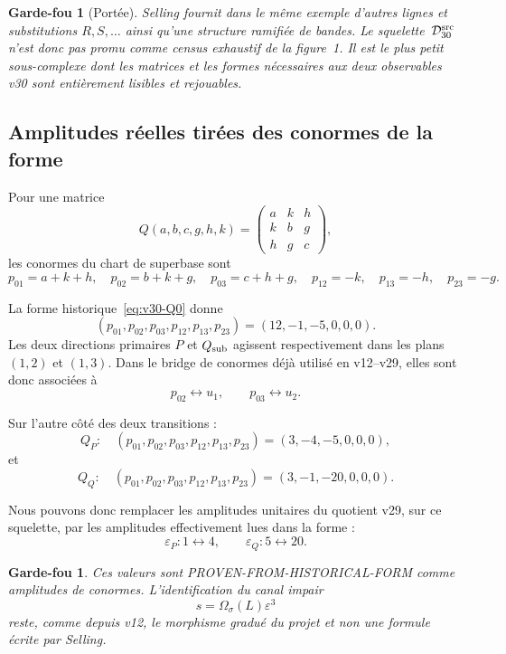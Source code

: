 \documentclass[11pt,a4paper]{article}
\newtheorem{guardrail}[theorem]{Garde-fou}
\begin{document}
\begin{guardrail}[Portée]
Selling fournit dans le même exemple d'autres lignes et substitutions $R,S,\ldots$ ainsi qu'une structure ramifiée de bandes. Le squelette~$\mathcal D_{30}^{\rm src}$ n'est donc pas promu comme census exhaustif de la figure~1. Il est le plus petit sous-complexe dont les matrices et les formes nécessaires aux deux observables v30 sont entièrement lisibles et rejouables.
\end{guardrail}

\subsection{Amplitudes réelles tirées des conormes de la forme}

Pour une matrice
\[
 Q(a,b,c,g,h,k)
 =
 \begin{pmatrix}
 a&k&h\\
 k&b&g\\
 h&g&c
 \end{pmatrix},
\]
les conormes du chart de superbase sont
\[
 p_{01}=a+k+h,\quad
 p_{02}=b+k+g,\quad
 p_{03}=c+h+g,\quad
 p_{12}=-k,\quad
 p_{13}=-h,\quad
 p_{23}=-g.
\]

La forme historique~\eqref{eq:v30-Q0} donne
\begin{equation}\label{eq:v30-conorm-Q0}
 \boxed{
 (p_{01},p_{02},p_{03},p_{12},p_{13},p_{23})
 =
 (12,-1,-5,0,0,0).}
\end{equation}
Les deux directions primaires $P$ et $Q_{\rm sub}$ agissent respectivement dans les plans $(1,2)$ et $(1,3)$. Dans le bridge de conormes déjà utilisé en v12--v29, elles sont donc associées à
\[
 p_{02}\leftrightarrow u_1,
 \qquad
 p_{03}\leftrightarrow u_2.
\]

Sur l'autre côté des deux transitions :
\[
 Q_P:\quad
 (p_{01},p_{02},p_{03},p_{12},p_{13},p_{23})
 =
 (3,-4,-5,0,0,0),
\]
et
\[
 Q_Q:\quad
 (p_{01},p_{02},p_{03},p_{12},p_{13},p_{23})
 =
 (3,-1,-20,0,0,0).
\]

Nous pouvons donc remplacer les amplitudes unitaires du quotient v29, sur ce squelette, par les amplitudes effectivement lues dans la forme :
\begin{equation}\label{eq:v30-real-eps}
 \boxed{
 \varepsilon_P:1\longleftrightarrow4,
 \qquad
 \varepsilon_Q:5\longleftrightarrow20.}
\end{equation}

\begin{guardrail}
Ces valeurs sont \emph{PROVEN-FROM-HISTORICAL-FORM} comme amplitudes de conormes. L'identification du canal impair
\[
 s=\Omega_\sigma(L)\varepsilon^3
\]
reste, comme depuis v12, le morphisme gradué du projet et non une formule écrite par Selling.
\end{guardrail}
\end{document}
